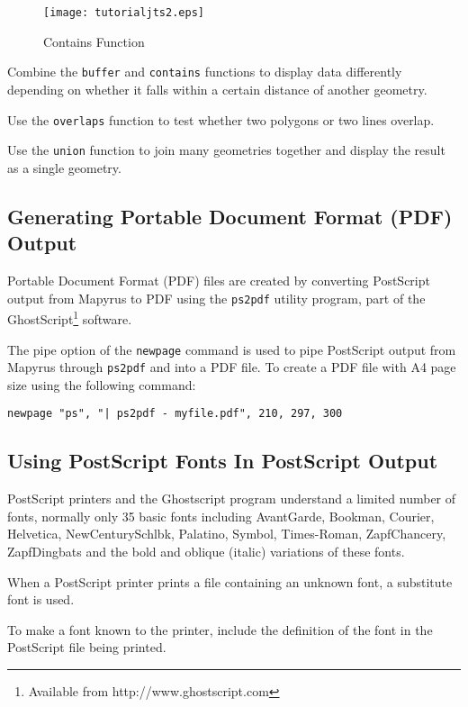 \begin{figure}[htb]
\texttt{[image: tutorialjts2.eps]}
\caption{Contains Function}
\label{tutorialjts2}
\end{figure}

Combine the \texttt{buffer} and \texttt{contains} functions to
display data differently depending on whether it falls within
a certain distance of another geometry.

Use the \texttt{overlaps} function to test whether two
polygons or two lines overlap.

Use the \texttt{union} function to join many geometries together
and display the result as a single geometry.

\subsection{Generating Portable Document Format (PDF) Output}
\label{pdf}


Portable Document Format (PDF) files are created by converting PostScript
output from Mapyrus to PDF using the \texttt{ps2pdf} utility program, part of
the GhostScript\footnote{Available from http://www.ghostscript.com} software.

The pipe option of the \texttt{newpage} command is used to pipe PostScript
output from Mapyrus through \texttt{ps2pdf} and into a PDF file.  To create
a PDF file with A4 page size using the following command:

\begin{verbatim}
newpage "ps", "| ps2pdf - myfile.pdf", 210, 297, 300
\end{verbatim}

\subsection{Using PostScript Fonts In PostScript Output}
\label{psfonts}

PostScript printers and the Ghostscript program
understand a limited number of fonts,
normally only 35 basic fonts including
AvantGarde,
Bookman,
Courier,
Helvetica,
NewCenturySchlbk,
Palatino,
Symbol,
Times-Roman,
ZapfChancery,
ZapfDingbats
and the bold
and oblique (italic) variations of these fonts.

When a PostScript printer prints a file containing an unknown font,
a substitute font is used.

To make a font known to the printer, include the definition of
the font in the PostScript file being printed.

